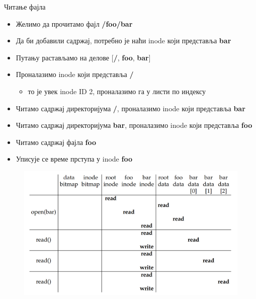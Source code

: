 \documentclass[xcolor=table]{beamer}
\begin{document}
    \begin{frame}[allowframebreaks]{Читање фајла}
        \begin{itemize}
            \item Желимо да прочитамо фајл \textbf{/foo/bar}
            \item Да би добавили садржај, потребно је наћи inode који представља \textbf{bar}
            \item Путању растављамо на делове [\textbf{/}, \textbf{foo}, \textbf{bar}]
            \item Проналазимо inode који представља \textbf{/}
            \begin{itemize}
                \item то је увек inode ID 2, проналазимо га у листи по индексу
            \end{itemize}
            \item Читамо садржај директоријума \textbf{/}, проналазимо inode који представља \textbf{bar}
            \item Читамо садржај директоријума \textbf{bar}, проналазимо inode који представља \textbf{foo}
            \item Читамо садржај фајла \textbf{foo}
            \item Уписује се време прступа у inode \textbf{foo}
        \end{itemize}
        
        \framebreak
        
        \begin{figure}
            \centering
            \includegraphics[width=\textwidth,height=0.8\textheight,keepaspectratio]{images/read.png}
            \label{fig:read.png}
        \end{figure}
    \end{frame}
    
\end{document}
